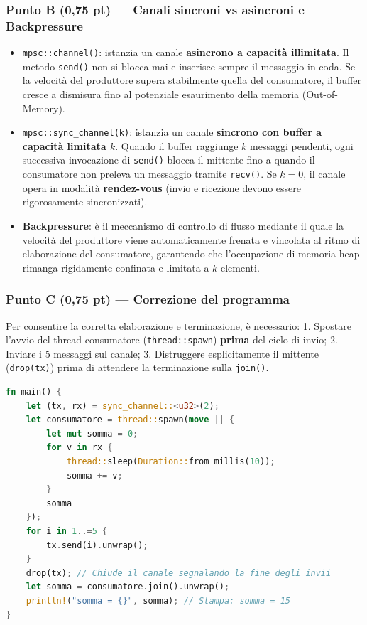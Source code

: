 \documentclass[11pt,a4paper]{article}
\begin{document}
\subsubsection*{Punto B (0,75 pt) --- Canali sincroni vs asincroni e Backpressure}
\begin{itemize}[leftmargin=1.5em]
    \item \texttt{mpsc::channel()}: istanzia un canale \textbf{asincrono a capacità illimitata}. Il metodo \texttt{send()} non si blocca mai e inserisce sempre il messaggio in coda. Se la velocità del produttore supera stabilmente quella del consumatore, il buffer cresce a dismisura fino al potenziale esaurimento della memoria (Out-of-Memory).
    \item \texttt{mpsc::sync\_channel(k)}: istanzia un canale \textbf{sincrono con buffer a capacità limitata $k$}. Quando il buffer raggiunge $k$ messaggi pendenti, ogni successiva invocazione di \texttt{send()} blocca il mittente fino a quando il consumatore non preleva un messaggio tramite \texttt{recv()}. Se $k = 0$, il canale opera in modalità \textbf{rendez-vous} (invio e ricezione devono essere rigorosamente sincronizzati).
    \item \textbf{Backpressure}: è il meccanismo di controllo di flusso mediante il quale la velocità del produttore viene automaticamente frenata e vincolata al ritmo di elaborazione del consumatore, garantendo che l'occupazione di memoria heap rimanga rigidamente confinata e limitata a $k$ elementi.
\end{itemize}

\subsubsection*{Punto C (0,75 pt) --- Correzione del programma}
Per consentire la corretta elaborazione e terminazione, è necessario:
1. Spostare l'avvio del thread consumatore (\texttt{thread::spawn}) \textbf{prima} del ciclo di invio;
2. Inviare i 5 messaggi sul canale;
3. Distruggere esplicitamente il mittente (\texttt{drop(tx)}) prima di attendere la terminazione sulla \texttt{join()}.
\begin{lstlisting}[language=Rust]
fn main() {
    let (tx, rx) = sync_channel::<u32>(2);
    let consumatore = thread::spawn(move || {
        let mut somma = 0;
        for v in rx {
            thread::sleep(Duration::from_millis(10));
            somma += v;
        }
        somma
    });
    for i in 1..=5 {
        tx.send(i).unwrap();
    }
    drop(tx); // Chiude il canale segnalando la fine degli invii
    let somma = consumatore.join().unwrap();
    println!("somma = {}", somma); // Stampa: somma = 15
}
\end{lstlisting}
\end{document}
